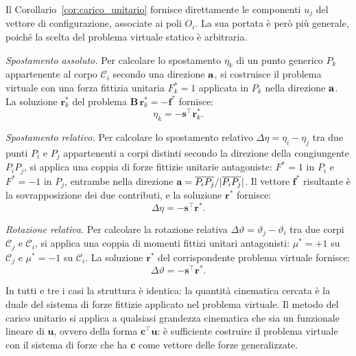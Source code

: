 \begin{oss}
	Il Corollario~\ref{cor:carico_unitario} fornisce
	direttamente le componenti $u_j$ del vettore di
	configurazione, associate ai poli $O_i$. La sua
	portata è però più generale, poiché la scelta del
	problema virtuale statico è arbitraria.
	
	\medskip
	\noindent\textit{Spostamento assoluto.}
	Per calcolare lo spostamento $\eta_k$ di un punto
	generico $P_k$ appartenente al corpo $\mathcal{C}_i$
	secondo una direzione $\mathbf{a}$, si costruisce il
	problema virtuale con una forza fittizia unitaria
	$F_k^* = 1$ applicata in $P_k$ nella direzione
	$\mathbf{a}$. La soluzione $\bm{r}^*_k$ del problema
	$\bm{B}\,\bm{r}^*_k = -\bm{f}^*$ fornisce:
	\begin{equation}\label{eq:carico_unitario_gen}
		\eta_k = -\bm{s}^{\top}\bm{r}^*_k.
	\end{equation}
	
	\medskip
	\noindent\textit{Spostamento relativo.}
	Per calcolare lo spostamento relativo
	$\Delta\eta = \eta_i - \eta_j$ tra due punti $P_i$
	e $P_j$ appartenenti a corpi distinti secondo la
	direzione della congiungente $P_iP_j$, si applica
	una coppia di forze fittizie unitarie antagoniste:
	$F^* = 1$ in $P_i$ e $F^* = -1$ in $P_j$, entrambe
	nella direzione $\mathbf{a} = \overline{P_iP_j}/
	\lvert\overline{P_iP_j}\rvert$. Il vettore $\bm{f}^*$
	risultante è la sovrapposizione dei due contributi,
	e la soluzione $\bm{r}^*$ fornisce:
	\begin{equation}\label{eq:scorrimento_relativo}
		\Delta\eta = -\bm{s}^{\top}\bm{r}^*.
	\end{equation}
	
	\medskip
	\noindent\textit{Rotazione relativa.}
	Per calcolare la rotazione relativa
	$\Delta\vartheta = \vartheta_j - \vartheta_i$
	tra due corpi $\mathcal{C}_j$ e $\mathcal{C}_i$,
	si applica una coppia di momenti fittizi unitari
	antagonisti: $\mu^* = +1$ su $\mathcal{C}_j$ e
	$\mu^* = -1$ su $\mathcal{C}_i$. La soluzione
	$\bm{r}^*$ del corrispondente problema virtuale
	fornisce:
	\begin{equation}\label{eq:rotazione_relativa}
		\Delta\vartheta = -\bm{s}^{\top}\bm{r}^*.
	\end{equation}
	
	\medskip\noindent
	In tutti e tre i casi la struttura è identica: la
	quantità cinematica cercata è la duale del sistema
	di forze fittizie applicato nel problema virtuale.
	Il metodo del carico unitario si applica a qualsiasi
	grandezza cinematica che sia un funzionale lineare
	di $\bm{u}$, ovvero della forma $\bm{c}^{\top}\bm{u}$:
	è sufficiente costruire il problema virtuale con il
	sistema di forze che ha $\bm{c}$ come vettore delle
	forze generalizzate.
\end{oss}

